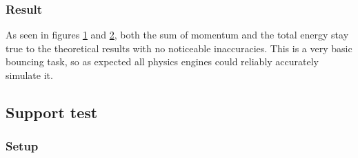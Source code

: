 \documentclass[12pt,a4paper,twoside,openright]{report}
\begin{document}
\subsubsection{Result}

\begin{figure} \label{ev1}
    \begin{center}
      \end{center}
    \end{figure}

    \begin{figure} \label{ev2}
        \begin{center}
          \end{center}
        \end{figure}
            
As seen in figures \ref{ev1} and \ref{ev2}, both the sum of momentum and the total energy stay true to the theoretical results with no noticeable inaccuracies. This is a very basic bouncing task, so as expected all physics engines could reliably accurately simulate it.

\subsection{Support test}

\subsubsection{Setup}
\end{document}
